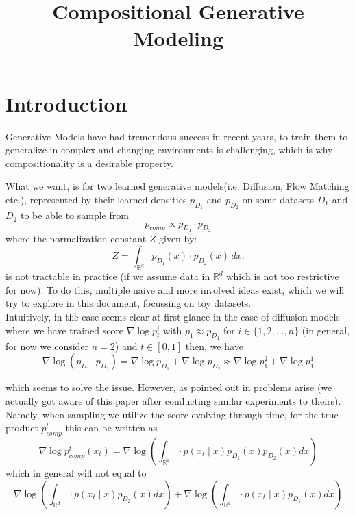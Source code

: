 \documentclass{article}
\title{Compositional Generative Modeling}
\author{ }
\date{}
\makeatletter
\newcommand{\mathleft}{\@fleqntrue\@mathmargin10pt}
\newcommand{\R}{\mathbb{R}}
\makeatother
\begin{document}
\maketitle

\newlength\breite
\setlength\breite{\linewidth-4pt}
\setlength\fboxsep{0pt}
\setlength\fboxrule{0.25pt}
\setlength{\abovedisplayskip}{3mm} %
\setlength{\belowdisplayskip}{3mm} %
\setlength\itemsep{0pt}
\setlength\parindent{0pt}


\mathleft

\section*{Introduction}

Generative Models have had tremendous success in recent years, to train them to generalize in complex and changing environments is challenging, which is why compositionality is a desirable property. 

What we want, is for two learned generative models(i.e. Diffusion, Flow Matching etc.), represented by their learned densities $p_{D_1}$ and $p_{D_2}$ on some datasets $D_1$ and $D_2$ to be able to sample from $$p_{comp} \propto p_{D_1} \cdot p_{D_2}$$ where the normalization constant $Z$ given by:
\[
Z = \int_{\R^d} p_{D_1}(x) \cdot p_{D_2}(x) \, dx.
\]
is not tractable in practice (if we assume data in $\R^d$ which is not too restrictive for now). To do this, multiple naive and more involved ideas exist, which we will try to explore in this document, focussing on toy datasets. \\

Intuitively, in the case seems clear at first glance in the case of diffusion models where we have trained score $\nabla \log p^i_{t}$ with $p_1 \approx p_{D_1}$ for $i \in \{1,2,...,n\}$ (in general, for now we consider $n = 2$) and $t \in [0,1]$ then, we have $$\nabla \log (p_{D_1} \cdot p_{D_2}) = \nabla \log p_{D_1} + \nabla \log  p_{D_2} \approx \nabla \log p^2_{1} + \nabla \log  p^1_{1}$$ 

which seems to solve the issue. However, as pointed out in \cite{reduce} problems arise (we actually got aware of this paper after conducting similar experiments to theirs). Namely, when sampling we utilize the score evolving through time, for the true product $p^t_{comp}$ this can be written as $$\nabla \log p^t_{comp} (x_t) = \nabla \log \left( \int_{\R^d} \cdot p(x_t \mid x) p_{D_1}(x) p_{D_2}(x)dx \right)$$ 
which in general will not equal to $$\nabla \log \left( \int_{\R^d} \cdot p(x_t \mid x) p_{D_2}(x)dx \right) + \nabla \log \left( \int_{\R^d} \cdot p(x_t \mid x) p_{D_1}(x)dx \right)$$
\end{document}
